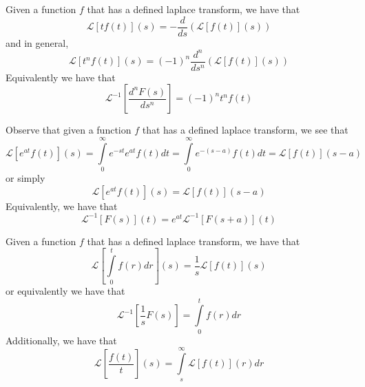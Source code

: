 

\begin{props}
        Given a function $f$ that has a defined laplace transform, we have that \begin{equation}
                \mathcal{L}[tf(t)](s) = -\frac{d}{ds}\left(\mathcal{L}[f(t)](s)\right)
        \end{equation}
        and in general, \begin{equation}
                \mathcal{L}[t^nf(t)](s) = (-1)^n\frac{d^n}{ds^n}\left(\mathcal{L}[f(t)](s)\right)
        \end{equation}
        Equivalently we have that \begin{equation}
                \mathcal{L}^{-1}\left[\frac{d^nF(s)}{ds^n}\right] = (-1)^nt^nf(t)
        \end{equation}
\end{props}




\begin{props}
        Observe that given a function $f$ that has a defined laplace transform, we see that \begin{equation}
                \mathcal{L}[e^{at}f(t)](s) = \int\limits_0^{\infty}e^{-st}e^{at}f(t)dt = \int\limits_0^{\infty}e^{-(s-a)}f(t)dt = \mathcal{L}[f(t)](s-a)
        \end{equation}
        or simply \begin{equation}
                \mathcal{L}[e^{at}f(t)](s) = \mathcal{L}[f(t)](s-a)
        \end{equation}
        Equivalently, we have that \begin{equation}
                \mathcal{L}^{-1}[F(s)](t) = e^{at}\mathcal{L}^{-1}[F(s+a)](t)
        \end{equation}
\end{props}




\begin{props}
        Given a function $f$ that has a defined laplace transform, we have that \begin{equation}
                \mathcal{L}\left[\int\limits_0^tf(r)dr\right](s) = \frac{1}{s}\mathcal{L}[f(t)](s)
        \end{equation}
        or equivalently we have that \begin{equation}
                \mathcal{L}^{-1}\left[\frac{1}{s}F(s)\right] = \int\limits_0^tf(r)dr
        \end{equation}
        Additionally, we have that \begin{equation}
                \mathcal{L}\left[\frac{f(t)}{t}\right](s) = \int\limits_s^{\infty}\mathcal{L}[f(t)](r)dr
        \end{equation}
\end{props}


